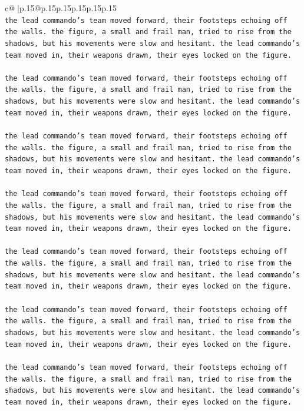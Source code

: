 \documentclass{article}
\begin{document}
{\begin{supertabular}{c@{$\;$}|p{.15\linewidth}@{}p{.15\linewidth}p{.15\linewidth}p{.15\linewidth}p{.15\linewidth}p{.15\linewidth}}
{{{\\ 
\texttt{the lead commando's team moved forward, their footsteps echoing off the walls. the figure, a small and frail man, tried to rise from the shadows, but his movements were slow and hesitant. the lead commando's team moved in, their weapons drawn, their eyes locked on the figure.} \\
\\ 
\texttt{the lead commando's team moved forward, their footsteps echoing off the walls. the figure, a small and frail man, tried to rise from the shadows, but his movements were slow and hesitant. the lead commando's team moved in, their weapons drawn, their eyes locked on the figure.} \\
\\ 
\texttt{the lead commando's team moved forward, their footsteps echoing off the walls. the figure, a small and frail man, tried to rise from the shadows, but his movements were slow and hesitant. the lead commando's team moved in, their weapons drawn, their eyes locked on the figure.} \\
\\ 
\texttt{the lead commando's team moved forward, their footsteps echoing off the walls. the figure, a small and frail man, tried to rise from the shadows, but his movements were slow and hesitant. the lead commando's team moved in, their weapons drawn, their eyes locked on the figure.} \\
\\ 
\texttt{the lead commando's team moved forward, their footsteps echoing off the walls. the figure, a small and frail man, tried to rise from the shadows, but his movements were slow and hesitant. the lead commando's team moved in, their weapons drawn, their eyes locked on the figure.} \\
\\ 
\texttt{the lead commando's team moved forward, their footsteps echoing off the walls. the figure, a small and frail man, tried to rise from the shadows, but his movements were slow and hesitant. the lead commando's team moved in, their weapons drawn, their eyes locked on the figure.} \\
\\ 
\texttt{the lead commando's team moved forward, their footsteps echoing off the walls. the figure, a small and frail man, tried to rise from the shadows, but his movements were slow and hesitant. the lead commando's team moved in, their weapons drawn, their eyes locked on the figure.} \\
}}}
\end{supertabular}}
\end{document}
